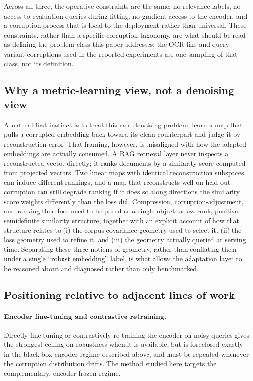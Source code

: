 Across all three, the operative constraints are the same: no relevance
labels, no access to evaluation queries during fitting, no gradient access
to the encoder, and a corruption process that is local to the deployment
rather than universal. These constraints, rather than a specific corruption
taxonomy, are what should be read as defining the problem class this paper
addresses; the OCR-like and query-variant corruptions used in the reported
experiments are one sampling of that class, not its definition.

\subsection{Why a metric-learning view, not a denoising view}

A natural first instinct is to treat this as a denoising problem: learn a
map that pulls a corrupted embedding back toward its clean counterpart and
judge it by reconstruction error. That framing, however, is misaligned with
how the adapted embeddings are actually consumed. A RAG retrieval layer
never inspects a reconstructed vector directly; it ranks documents by a
similarity score computed from projected vectors. Two linear maps with
identical reconstruction subspaces can induce different rankings, and a map
that reconstructs well on held-out corruption can still degrade ranking
if it does so along directions the similarity score weights differently
than the loss did. Compression, corruption-adjustment, and ranking
therefore need to be posed as a single object: a low-rank, positive
semidefinite similarity structure, together with an explicit account of how
that structure relates to (i) the corpus covariance geometry used to select
it, (ii) the loss geometry used to refine it, and (iii) the geometry
actually queried at serving time. Separating these three notions of
geometry, rather than conflating them under a single ``robust embedding''
label, is what allows the adaptation layer to be reasoned about and
diagnosed rather than only benchmarked.

\subsection{Positioning relative to adjacent lines of work}

\paragraph{Encoder fine-tuning and contrastive retraining.} Directly
fine-tuning or contrastively re-training the encoder on noisy queries
gives the strongest ceiling on robustness when it is available, but is
foreclosed exactly in the black-box-encoder regime described above, and
must be repeated whenever the corruption distribution drifts. The method
studied here targets the complementary, encoder-frozen regime.

